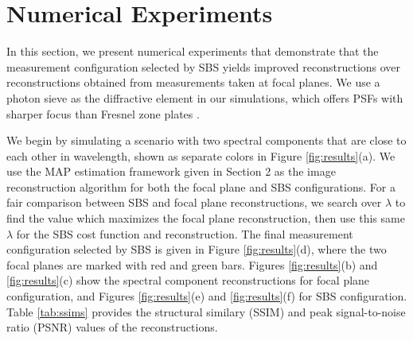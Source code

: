 \documentclass{article}
\begin{document}
%
%
%
%
%

\section{Numerical Experiments}
In this section, we present numerical experiments that demonstrate that the
measurement configuration selected by SBS yields improved reconstructions over
reconstructions obtained from measurements taken at focal planes.
We use a photon sieve as the
diffractive element in our simulations, which offers PSFs with sharper focus
than Fresnel zone plates \cite{kipp2001sharper}.

We begin by simulating a scenario with two spectral components that are close to
each other in wavelength, shown as separate colors in Figure
\ref{fig:results}(a). We use the MAP estimation framework given in Section 2 as
the image reconstruction algorithm for both the focal plane and SBS
configurations. For a fair comparison between SBS and focal plane
reconstructions, we search over $\lambda$ to find the value which maximizes the
focal plane reconstruction, then use this same $\lambda$ for the SBS cost
function and reconstruction. The final measurement configuration selected by SBS
is given in Figure \ref{fig:results}(d), where the two focal planes are marked
with red and green bars. Figures \ref{fig:results}(b) and \ref{fig:results}(c)
show the spectral component reconstructions for focal plane configuration, and
Figures \ref{fig:results}(e) and \ref{fig:results}(f) for SBS
configuration. Table \ref{tab:ssims} provides the structural similary (SSIM) \cite{ssim} and
peak signal-to-noise ratio (PSNR) values of the reconstructions.
\end{document}
